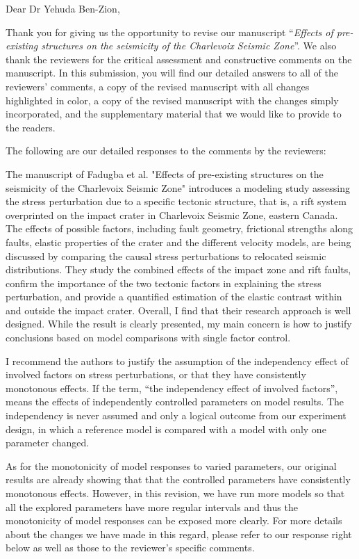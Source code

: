 \documentclass[12pt]{article}
\title{}
\date{}
\newcommand\PaperTitle[1]{``\textit{#1}''}
\begin{document}
\noindent Dear Dr Yehuda Ben-Zion,
\\\vspace{1em}

Thank you for giving us the opportunity to revise our manuscript \PaperTitle{Effects of pre-existing structures on the seismicity of the Charlevoix Seismic Zone}. We also thank the reviewers for the critical assessment and constructive comments on the manuscript. In this submission, you will find our detailed answers to all of the reviewers’ comments, a copy of the revised manuscript with all changes highlighted in color, a copy of the revised manuscript with the changes simply incorporated, and the supplementary material that we would like to provide to the readers.

The following are our detailed responses to the comments by the reviewers:


\begin{response}{The manuscript of Fadugba et al. "Effects of pre-existing structures on the seismicity of the Charlevoix Seismic Zone" introduces a modeling study assessing the stress perturbation due to a specific tectonic structure, that is, a rift system overprinted on the impact crater in Charlevoix Seismic Zone, eastern Canada. The effects of possible factors, including fault geometry, frictional strengths along faults, elastic properties of the crater and the different velocity models, are being discussed by comparing the causal stress perturbations to relocated seismic distributions. They study the combined effects of the impact zone and rift faults, confirm the importance of the two tectonic factors in explaining the stress perturbation, and provide a quantified estimation of the elastic contrast within and outside the impact crater. Overall, I find that their research approach is well designed. While the result is clearly presented, my main concern is how to justify conclusions based on model comparisons with single factor control.}
\end{response}

\begin{response}{I recommend the authors to justify the assumption of the independency effect of involved factors on stress perturbations, or that they have consistently monotonous effects.}
    If the term, ``the independency effect of involved factors'', means the effects of independently controlled parameters on model results. The independency is never assumed and only a logical outcome from our experiment design, in which a reference model is compared with a model with only one parameter changed. 

As for the monotonicity of model responses to varied parameters, our original results are already showing that that the controlled parameters have consistently monotonous effects. However, in this revision, we have run more models so that all the explored parameters have more regular intervals and thus the monotonicity of model responses can be exposed more clearly. For more details about the changes we have made in this regard, please refer to our response right below as well as those to the reviewer's specific comments.
\end{response}
\end{document}
